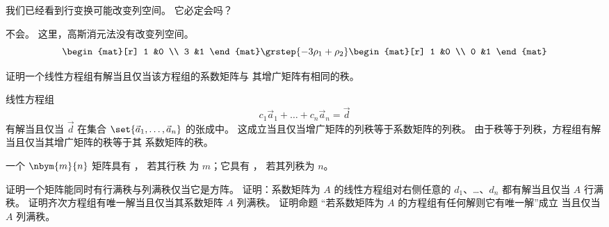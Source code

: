   \recommended \item
    我们已经看到行变换可能改变列空间。
    它必定会吗？
    \begin{answer}
      不会。
      这里，高斯消元法没有改变列空间。
      \begin{equation*}
        \begin{mat}[r]
          1  &0  \\
          3  &1
        \end{mat}
        \grstep{-3\rho_1+\rho_2}
        \begin{mat}[r]
          1  &0  \\
          0  &1
        \end{mat}
      \end{equation*}
    \end{answer}
  \item
    证明一个线性方程组有解当且仅当该方程组的系数矩阵与
    其增广矩阵有相同的秩。
    \begin{answer}
      线性方程组
      \begin{equation*}
        c_1\vec{a}_1+\dots+c_n\vec{a}_n=\vec{d}
      \end{equation*}
      有解当且仅当 \( \vec{d} \) 在集合 \( \set{\vec{a}_1,\dots,\vec{a}_n} \)
      的张成中。
      这成立当且仅当增广矩阵的列秩等于系数矩阵的列秩。
      由于秩等于列秩，方程组有解当且仅当其增广矩阵的秩等于其
      系数矩阵的秩。
    \end{answer}
  \item
    一个 \( \nbym{m}{n} \) 矩阵具有
    ，
    若其行秩
    为 \( m \)；它具有
    ，
    若其列秩为 \( n \)。
    \begin{exparts}
      \partsitem 证明一个矩阵能同时有行满秩与列满秩仅当它是方阵。
      \partsitem 证明：系数矩阵为 \( A \) 的线性方程组对右侧任意的
        \( d_1 \)、\ldots、\( d_n \) 都有解当且仅当 \( A \) 行满秩。
      \partsitem 证明齐次方程组有唯一解当且仅当其系数矩阵
        $A$ 列满秩。
      \partsitem 证明命题
       “若系数矩阵为 \( A \) 的方程组有任何解则它有唯一解”成立
        当且仅当 \( A \) 列满秩。
    \end{exparts}
